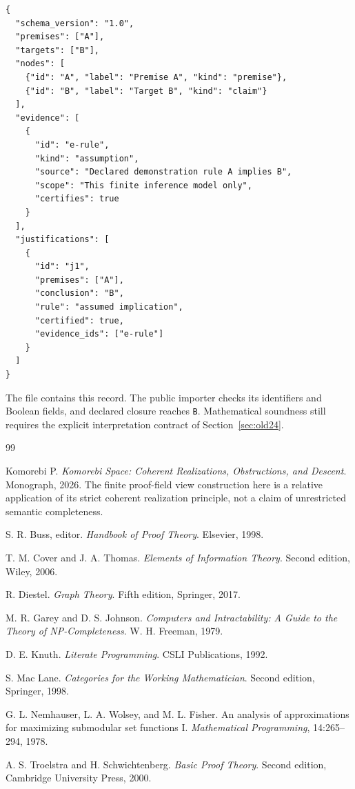 \documentclass[11pt,oneside]{article}
\theoremstyle{komorebiplain}
\theoremstyle{komorebidefinition}
\theoremstyle{komorebiremark}
\begin{document}
\begin{lstlisting}[language={},basicstyle=\ttfamily\fontsize{9.5}{11.4}\selectfont]
{
  "schema_version": "1.0",
  "premises": ["A"],
  "targets": ["B"],
  "nodes": [
    {"id": "A", "label": "Premise A", "kind": "premise"},
    {"id": "B", "label": "Target B", "kind": "claim"}
  ],
  "evidence": [
    {
      "id": "e-rule",
      "kind": "assumption",
      "source": "Declared demonstration rule A implies B",
      "scope": "This finite inference model only",
      "certifies": true
    }
  ],
  "justifications": [
    {
      "id": "j1",
      "premises": ["A"],
      "conclusion": "B",
      "rule": "assumed implication",
      "certified": true,
      "evidence_ids": ["e-rule"]
    }
  ]
}
\end{lstlisting}

The file  contains this record. The public importer checks its identifiers and Boolean fields, and declared closure reaches \texttt{B}. Mathematical soundness still requires the explicit interpretation contract of Section~\ref{sec:old24}.

\clearpage
{}
{}
\begin{thebibliography}{99}

Komorebi P.
\textit{Komorebi Space: Coherent Realizations, Obstructions, and Descent}.
Monograph, 2026. The finite proof-field view construction here is a relative application of its strict coherent realization principle, not a claim of unrestricted semantic completeness.

S. R. Buss, editor.
\textit{Handbook of Proof Theory}.
Elsevier, 1998.

T. M. Cover and J. A. Thomas.
\textit{Elements of Information Theory}.
Second edition, Wiley, 2006.

R. Diestel.
\textit{Graph Theory}.
Fifth edition, Springer, 2017.

M. R. Garey and D. S. Johnson.
\textit{Computers and Intractability: A Guide to the Theory of NP-Completeness}.
W. H. Freeman, 1979.

D. E. Knuth.
\textit{Literate Programming}.
CSLI Publications, 1992.

S. Mac Lane.
\textit{Categories for the Working Mathematician}.
Second edition, Springer, 1998.

G. L. Nemhauser, L. A. Wolsey, and M. L. Fisher.
An analysis of approximations for maximizing submodular set functions I.
\textit{Mathematical Programming}, 14:265--294, 1978.

A. S. Troelstra and H. Schwichtenberg.
\textit{Basic Proof Theory}.
Second edition, Cambridge University Press, 2000.

\end{thebibliography}
\end{document}
